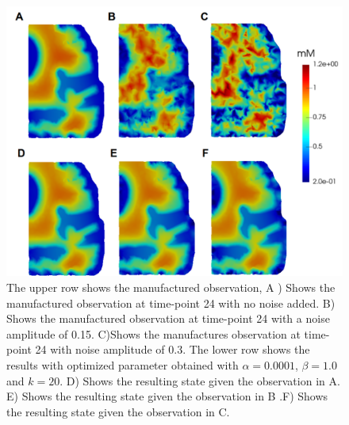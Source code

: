 \documentclass[11pt,a4paper]{article}
\begin{document}
\begin{figure}
\centering
\includegraphics[scale=0.4]{noise-24.png}
\caption{The upper row shows the manufactured observation, A ) Shows the manufactured observation at time-point 24 with no noise added. B) Shows the manufactured observation at time-point 24 with a noise amplitude of 0.15. C)Shows the manufactures observation at time-point 24 with noise amplitude of 0.3. The lower row shows the results with optimized parameter obtained with $\alpha=0.0001$, $\beta=1.0$ and $k=20$. D) Shows the resulting state given the observation in A. E)  Shows the resulting state given the observation in B .F) Shows the resulting state given the observation in C.  }
\label{24hourswithnoise}
\end{figure}




%
\end{document}
